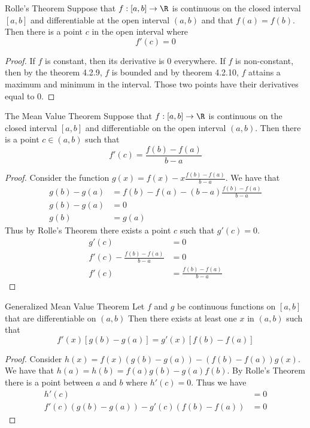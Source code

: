 \begin{thm}{Rolle's Theorem}{} Suppose that $f:[a,b]\to\R$ is continuous on the closed interval $[a,b]$ and differentiable at the open interval $(a,b)$ and that $f(a)=f(b)$. Then there is a point $c$ in the open interval where $$f'(c)=0$$ \tcbline
\begin{proof} If $f$ is constant, then its derivative is $0$ everywhere. If $f$ is non-constant, then by the theorem 4.2.9, $f$ is bounded and by theorem 4.2.10, $f$ attains a maximum and minimum in the interval. Those two points have their derivatives equal to $0$. 
\end{proof}
\end{thm}

\begin{thm}{The Mean Value Theorem}{} Suppose that $f:[a,b]\to\R$ is continuous on the closed interval $[a,b]$ and differentiable on the open interval $(a,b)$. Then there is a point $c\in(a,b)$ such that $$f'(c)=\frac{f(b)-f(a)}{b-a}$$ \tcbline
\begin{proof} Consider the function $g(x)=f(x)-x\frac{f(b)-f(a)}{b-a}$. We have that 
\begin{align*}
g(b)-g(a)&=f(b)-f(a)-(b-a)\frac{f(b)-f(a)}{b-a}\\
g(b)-g(a)&=0\\
g(b)&=g(a)
\end{align*} Thus by Rolle's Theorem there exists a point $c$ such that $g'(c)=0$. 
\begin{align*}
g'(c)&=0\\
f'(c)-\frac{f(b)-f(a)}{b-a}&=0\\
f'(c)&=\frac{f(b)-f(a)}{b-a}
\end{align*}
\end{proof}
\end{thm}

\begin{thm}{Generalized Mean Value Theorem}{} Let $f$ and $g$ be continuous functions on $[a,b]$ that are differentiable on $(a,b)$ Then there exists at least one $x$ in $(a,b)$ such that $$f'(x)[g(b)-g(a)]=g'(x)[f(b)-f(a)]$$\tcbline
\begin{proof} Consider $h(x)=f(x)(g(b)-g(a))-(f(b)-f(a))g(x)$. We have that $h(a)=h(b)=f(a)g(b)-g(a)f(b)$. By Rolle's Theorem there is a point between $a$ and $b$ where $h'(c)=0$. Thus we have 
\begin{align*}
h'(c)&=0\\
f'(c)(g(b)-g(a))-g'(c)(f(b)-f(a))&=0
\end{align*}
\end{proof}
\end{thm}


